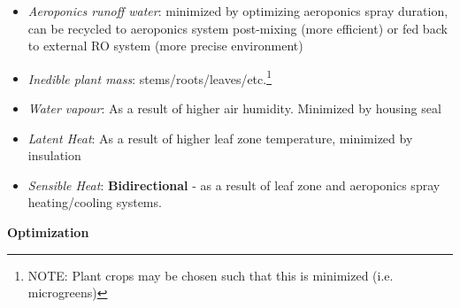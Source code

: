 \documentclass{report}
\begin{document}
\begin{itemize}
    \item \textit{Aeroponics runoff water}: minimized by optimizing aeroponics spray duration, can be recycled to aeroponics system post-mixing (more efficient) or fed back to external RO system (more precise environment)
    \item \textit{Inedible plant mass}: stems/roots/leaves/etc.\footnote{NOTE: Plant crops may be chosen such that this is minimized (i.e. microgreens)}
    \item \textit{Water vapour}: As a result of higher air humidity. Minimized by housing seal
    \item \textit{Latent Heat}: As a result of higher leaf zone temperature, minimized by insulation
    \item \textit{Sensible Heat}: \textbf{Bidirectional} - as a result of leaf zone and aeroponics spray heating/cooling systems.
\end{itemize}


\newpage

\textbf{Optimization}
\label{sec:resource-optimization}



\end{document}
